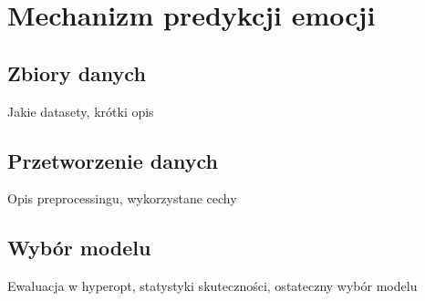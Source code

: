 \chapter{Mechanizm predykcji emocji}
\label{cha:predykcja}
\section{Zbiory danych}
Jakie datasety, krótki opis
\section{Przetworzenie danych}
Opis preprocessingu, wykorzystane cechy
\section{Wybór modelu}
Ewaluacja w hyperopt, statystyki skuteczności, ostateczny wybór modelu
